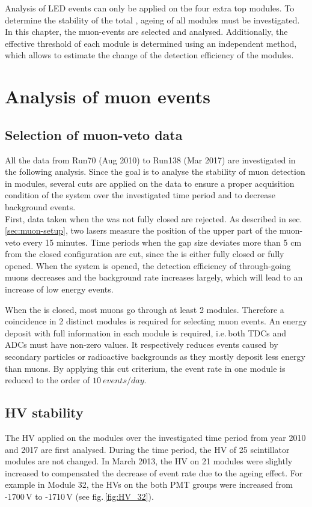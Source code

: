
Analysis of LED events can only be applied on the four extra top modules. To determine the stability of the total \mvs, ageing of all modules must be investigated. In this chapter, the muon-events are selected and analysed. Additionally, the effective threshold of each module is determined using an independent method, which allows to estimate the change of the detection efficiency of the modules.

\section{Analysis of muon events}

\subsection{Selection of muon-veto data}
All the data from Run70 (Aug 2010) to Run138 (Mar 2017) are investigated in the following analysis. Since the goal is to analyse the stability of muon detection in modules, several cuts are applied on the data to ensure a proper acquisition condition of the system over the investigated time period and to decrease background events.\\
First, data taken when the \mvs{} was not fully closed are rejected. As described in sec.\,\ref{sec:muon-setup}, two lasers measure the position of the upper part of the muon-veto every 15 minutes. Time periods when the gap size deviates more than 5 cm from the closed configuration are cut, since the \mvs{} is either fully closed or fully opened. When the system is opened, the detection efficiency of through-going muons decreases and the background rate increases largely, which will lead to an increase of low energy events.

When the \mvs{} is closed, most muons go through at least 2 modules. Therefore a coincidence in 2 distinct modules is required for selecting muon events. An energy deposit with full information in each module is required, i.e.\,both TDCs and ADCs must have non-zero values. It respectively reduces events caused by secondary particles or radioactive backgrounds as they mostly deposit less energy than muons. By applying this cut criterium, the event rate in one module is reduced to the order of $\SI{10}{events/day}$.

\subsection{HV stability}
The HV applied on the modules over the investigated time period from year 2010 and 2017 are first analysed. During the time period, the HV of 25 scintillator modules are not changed. In March 2013, the HV on 21 modules were slightly increased to compensated the decrease of event rate due to the ageing effect. For example in Module 32, the HVs on the both PMT groups were increased from -1700\,V to -1710\,V (see fig.\,\ref{fig:HV_32}).

